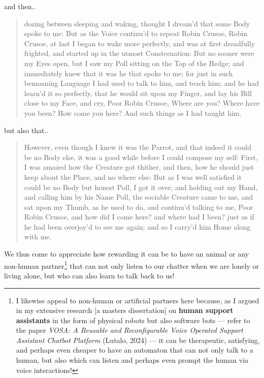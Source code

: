 \documentclass[a4paper]{article}
\begin{document}
and then..


\noindent
\begin{minipage}{1\textwidth}
\vspace{1em}
\begin{quotation}
{\ttfamily

dozing between sleeping and waking, thought I dream’d that some Body spoke to me: But as the Voice continu’d to repeat Robin Crusoe, Robin Crusoe, at last I began to wake more perfectly, and was at first dreadfully frighted, and started up in the utmost Consternation: But no sooner were my Eyes open, but I saw my Poll sitting on the Top of the Hedge; and immediately knew that it was he that spoke to me; for just in such bemoaning Language I had used to talk to him, and teach him; and he had learn’d it so perfectly, that he would sit upon my Finger, and lay his Bill close to my Face, and cry, Poor Robin Crusoe, Where are you? Where have you been? How come you here? And such things as I had taught him.

}
\end{quotation}
\vspace{1em}
\end{minipage}


but also that..



\noindent
\begin{minipage}{1\textwidth}
\vspace{1em}
\begin{quotation}
{\ttfamily

However, even though I knew it was the Parrot, and that indeed it could be no Body else, it was a good while before I could compose my self: First, I was amazed how the Creature got thither, and then, how he should just keep about the Place, and no where else: But as I was well satisfied it could be no Body but honest Poll, I got it over; and holding out my Hand, and calling him by his Name Poll, the sociable Creature came to me, and sat upon my Thumb, as he used to do, and continu’d talking to me, Poor Robin Crusoe, and how did I come here? and where had I been? just as if he had been overjoy’d to see me again; and so I carry’d him Home along with me.

}
\end{quotation}
\vspace{1em}
\end{minipage}



We thus come to appreciate how rewarding it can be to have an animal or any non-human partner\footnote{I likewise appeal to non-human or artificial partners here because, as I argued in my extensive research [a masters dissertation] on \textbf{human support assistants} in the form of physical robots but also software bots --- refer to the paper \textit{VOSA: A Reusable and Reconfigurable Voice Operated Support Assistant Chatbot Platform} (Lutalo, 2024) --- it can be therapeutic, satisfying, and perhaps even cheaper to have an automaton that can not only talk to a human, but also which can listen and perhaps even prompt the human via voice interactions!} that can not only listen to our chatter when we are lonely or living alone, but who can also learn to talk back to us! 
\end{document}

